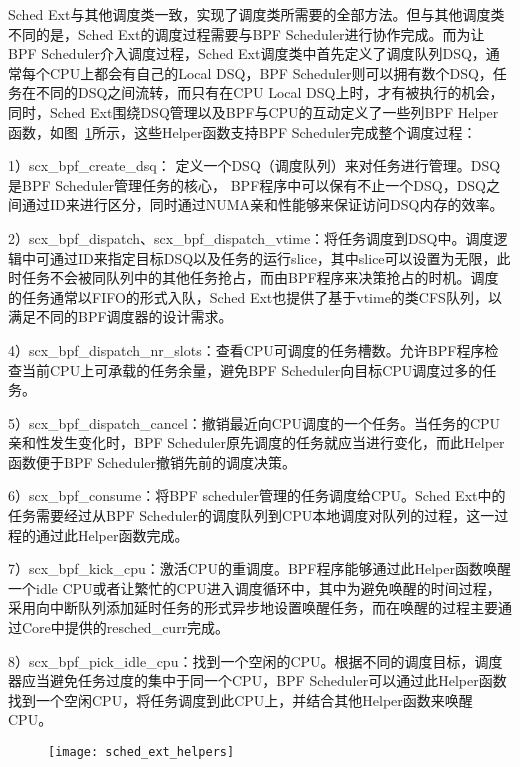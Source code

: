 Sched Ext与其他调度类一致，实现了调度类所需要的全部方法。但与其他调度类不同的是，Sched Ext的调度过程需要与BPF Scheduler进行协作完成。而为让BPF Scheduler介入调度过程，Sched Ext调度类中首先定义了调度队列DSQ，通常每个CPU上都会有自己的Local DSQ，BPF Scheduler则可以拥有数个DSQ，任务在不同的DSQ之间流转，而只有在CPU Local DSQ上时，才有被执行的机会，同时，Sched Ext围绕DSQ管理以及BPF与CPU的互动定义了一些列BPF Helper函数，如图~\ref{fig:sched_ext_helpers}所示，这些Helper函数支持BPF Scheduler完成整个调度过程：

1）scx\_bpf\_create\_dsq： 定义一个DSQ（调度队列）来对任务进行管理。DSQ是BPF Scheduler管理任务的核心， BPF程序中可以保有不止一个DSQ，DSQ之间通过ID来进行区分，同时通过NUMA亲和性能够来保证访问DSQ内存的效率。

2）scx\_bpf\_dispatch、scx\_bpf\_dispatch\_vtime：将任务调度到DSQ中。调度逻辑中可通过ID来指定目标DSQ以及任务的运行slice，其中slice可以设置为无限，此时任务不会被同队列中的其他任务抢占，而由BPF程序来决策抢占的时机。调度的任务通常以FIFO的形式入队，Sched Ext也提供了基于vtime的类CFS队列，以满足不同的BPF调度器的设计需求。

4）scx\_bpf\_dispatch\_nr\_slots：查看CPU可调度的任务槽数。允许BPF程序检查当前CPU上可承载的任务余量，避免BPF Scheduler向目标CPU调度过多的任务。

5）scx\_bpf\_dispatch\_cancel：撤销最近向CPU调度的一个任务。当任务的CPU亲和性发生变化时，BPF Scheduler原先调度的任务就应当进行变化，而此Helper函数便于BPF Scheduler撤销先前的调度决策。

6）scx\_bpf\_consume：将BPF scheduler管理的任务调度给CPU。Sched Ext中的任务需要经过从BPF Scheduler的调度队列到CPU本地调度对队列的过程，这一过程的通过此Helper函数完成。

7）scx\_bpf\_kick\_cpu：激活CPU的重调度。BPF程序能够通过此Helper函数唤醒一个idle CPU或者让繁忙的CPU进入调度循环中，其中为避免唤醒的时间过程，采用向中断队列添加延时任务的形式异步地设置唤醒任务，而在唤醒的过程主要通过Core中提供的resched\_curr完成。

8）scx\_bpf\_pick\_idle\_cpu：找到一个空闲的CPU。根据不同的调度目标，调度器应当避免任务过度的集中于同一个CPU，BPF Scheduler可以通过此Helper函数找到一个空闲CPU，将任务调度到此CPU上，并结合其他Helper函数来唤醒CPU。

\begin{figure}[!htbp]
    \centering
    \texttt{[image: sched\_ext\_helpers]}
    \label{fig:sched_ext_helpers}
\end{figure}

